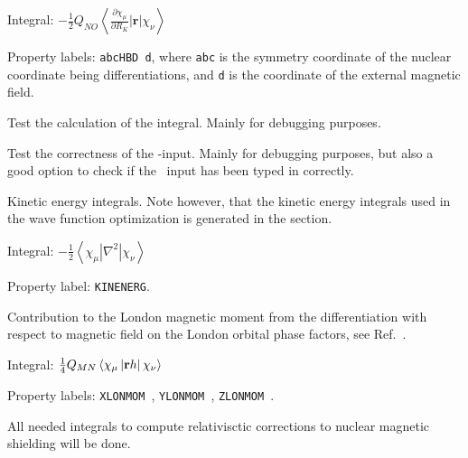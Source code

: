 \begin{description}
\begin{list}{}{}
\item Integral: $-\frac{1}{2}Q_{NO}\left<\frac{\partial
\chi_{\mu}}{\partial R_K}\left|{\mathbf r}\right|\chi_{\nu}\right>$
\item Property labels: \verb|abcHBD d|, where \verb|abc| is the
symmetry coordinate of the nuclear coordinate being differentiations,
and \verb|d| is the coordinate of the external magnetic field.
\end{list}

\item[\Key{HDOBRT}] Test the calculation of the 
integral. Mainly for debugging purposes.

\item[\Key{INPTES}] Test the correctness of the -input. Mainly
for debugging purposes, but also a good option to check if the \molinp\ input
has been typed in correctly.

\item[\Key{KINENE}] Kinetic energy integrals. Note however, that the kinetic energy integrals used in the
wave function optimization is generated in the  section.

\begin{list}{}{}
\item Integral:
$-\frac{1}{2}\left<\chi_{\mu}\left|\nabla^{2}\right|\chi_{\nu}\right>$
\item Property label: \verb|KINENERG|.
\end{list}

\item[\Key{LONMOM}] Contribution to the London magnetic
moment from
the differentiation with respect to magnetic field on the London
orbital phase factors, see Ref.~\cite{thpjjcp95}.

\begin{list}{}{}
\item Integral:
$\frac{1}{4}Q_{MN}\left<\chi_{\mu}\left|{\bf r}h\right|\chi_{\nu}\right>$
\item Property labels: \verb|XLONMOM |, \verb|YLONMOM |, \verb|ZLONMOM |.
\end{list}


\item[\Key{LRINTS}] All needed integrals to compute relativisctic corrections 
to nuclear magnetic shielding will be done. 



\end{description}
